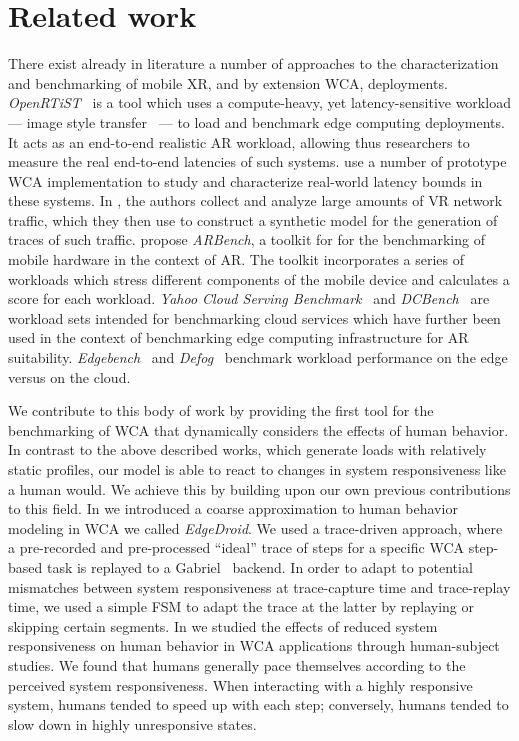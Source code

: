 \section{Related work}\label{sec:relwork}

There exist already in literature a number of approaches to the characterization and benchmarking of mobile \ac{XR}, and by extension \ac{WCA}, deployments.
\emph{OpenRTiST}~\cite{george2020openrtist} is a tool which uses a compute-heavy, yet latency-sensitive workload --- image style transfer~\cite{jing2019neural} --- to load and benchmark edge computing deployments.
It acts as an end-to-end realistic \ac{AR} workload, allowing thus researchers to measure the real end-to-end latencies of such systems.
\textcite{Chen2017Empirical} use a number of prototype \ac{WCA} implementation to study and characterize real-world latency bounds in these systems.
In \textcite{lecci2021open}, the authors collect and analyze large amounts of \ac{VR} network traffic, which they then use to construct a synthetic model for the generation of traces of such traffic.
\textcite{chetoui2022arbench} propose \emph{ARBench}, a toolkit for for the benchmarking of mobile hardware in the context of \ac{AR}.
The toolkit incorporates a series of workloads which stress different components of the mobile device and calculates a score for each workload.
\emph{Yahoo Cloud Serving Benchmark}~\cite{cooper2010benchmarking} and \emph{DCBench}~\cite{jia2013characterizing} are workload sets intended for benchmarking cloud services which have further been used in the context of benchmarking edge computing infrastructure for \ac{AR} suitability.
\emph{Edgebench}~\cite{das2018edgebench} and \emph{Defog}~\cite{mcchesney2019defog} benchmark workload performance on the edge versus on the cloud.

We contribute to this body of work by providing the first tool for the benchmarking of \ac{WCA} that dynamically considers the effects of human behavior.
In contrast to the above described works, which generate loads with relatively static profiles, our model is able to react to changes in system responsiveness like a human would.
We achieve this by building upon our own previous contributions to this field.
In \textcite{olguin2018scaling,olguin2019edgedroid} we introduced a coarse approximation to human behavior modeling in \ac{WCA} we called \emph{EdgeDroid}.
We used a trace-driven approach, where a pre-recorded and pre-processed ``ideal'' trace of steps for a specific \ac{WCA} step-based task is replayed to a Gabriel~\cite{Chen2018application} backend.
In order to adapt to potential mismatches between system responsiveness at trace-capture time and trace-replay time, we used a simple \ac{FSM} to adapt the trace at the latter by replaying or skipping certain segments.
In \textcite{olguinmunoz:impact2021} we studied the effects of reduced system responsiveness on human behavior in \ac{WCA} applications through human-subject studies.
We found that humans generally pace themselves according to the perceived system responsiveness.
When interacting with a highly responsive system, humans tended to speed up with each step; conversely, humans tended to slow down in highly unresponsive states.

